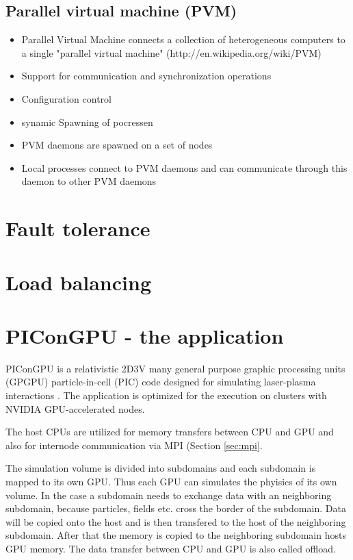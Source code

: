 \subsection{Parallel virtual machine (PVM)}
\label{sec:pvm}
\begin{itemize}
\item Parallel Virtual Machine connects a collection of heterogeneous computers
  to a single "parallel virtual machine"
  (http://en.wikipedia.org/wiki/PVM)
\item Support for communication and synchronization operations
\item Configuration control
\item synamic Spawning of pocressen
\item PVM daemons are spawned on a set of nodes
\item Local processes connect to PVM daemons and can 
  communicate through this daemon to other PVM daemons
\end{itemize}

\section{Fault tolerance}
\section{Load balancing}

\section{PIConGPU - the application}
\label{sec:picongpu}
PIConGPU is a relativistic 2D3V many general purpose graphic
processing units (GPGPU) particle-in-cell (PIC) code designed for
simulating laser-plasma interactions \cite{ref:picongpu}. The
application is optimized for the execution on clusters with NVIDIA
GPU-accelerated nodes.

The host CPUs are utilized for memory transfers between CPU and GPU and also 
for internode communication via MPI (Section \ref{sec:mpi}.

The simulation volume is divided into subdomains and each subdomain is
mapped to its own GPU. Thus each GPU can simulates the phyisics of its
own volume.  In the case a subdomain needs to exchange data with an
neighboring subdomain, because particles, fields etc. cross the border of the
subdomain.  Data will be copied onto the host and is then transfered to the
host of the neighboring subdomain. After that  the memory is copied to the
neighboring subdomain hosts GPU memory. The data transfer between 
CPU and GPU is also called offload.

